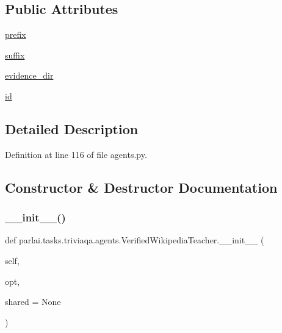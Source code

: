 \subsection*{Public Attributes}
\begin{DoxyCompactItemize}
\item 
\hyperlink{classparlai_1_1tasks_1_1triviaqa_1_1agents_1_1VerifiedWikipediaTeacher_a876c461eb0192fb040c30f4a2487c488}{prefix}
\item 
\hyperlink{classparlai_1_1tasks_1_1triviaqa_1_1agents_1_1VerifiedWikipediaTeacher_acc499929543ea473b7b298e28e22acab}{suffix}
\item 
\hyperlink{classparlai_1_1tasks_1_1triviaqa_1_1agents_1_1VerifiedWikipediaTeacher_a214e3d671d59a23a43315ccd367d8702}{evidence\+\_\+dir}
\item 
\hyperlink{classparlai_1_1tasks_1_1triviaqa_1_1agents_1_1VerifiedWikipediaTeacher_a37b2fd9a409408905a62cec4436774f2}{id}
\end{DoxyCompactItemize}


\subsection{Detailed Description}


Definition at line 116 of file agents.\+py.



\subsection{Constructor \& Destructor Documentation}
\mbox{\label{classparlai_1_1tasks_1_1triviaqa_1_1agents_1_1VerifiedWikipediaTeacher_a6af307d6cf32536d5a860a0481bea4a5}} 
\subsubsection{\texorpdfstring{\+\_\+\+\_\+init\+\_\+\+\_\+()}{\_\_init\_\_()}}
{\footnotesize\ttfamily def parlai.\+tasks.\+triviaqa.\+agents.\+Verified\+Wikipedia\+Teacher.\+\_\+\+\_\+init\+\_\+\+\_\+ (\begin{DoxyParamCaption}\item[{}]{self,  }\item[{}]{opt,  }\item[{}]{shared = {\ttfamily None} }\end{DoxyParamCaption})}



